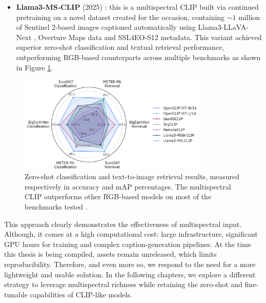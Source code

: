 \documentclass[a4paper, twoside, english]{sapthesis} %
\begin{document}
\begin{itemize}
    \item \textbf{Llama3‑MS‑CLIP} (2025) \cite{marimo2025beyond}: this is a multispectral CLIP built via continued pretraining on a novel dataset created for the occasion, containing $\sim 1$ million of Sentinel 2‑based images captioned automatically using Llama3-LLaVA-Next \cite{li2024llava}, Overture Maps data and SSL4EO-S12 \cite{wang2023ssl4eo} metadata. This variant achieved superior zero-shot classification and textual retrieval performance, outperforming RGB-based counterparts across multiple benchmarks as shown in Figure \ref{fig:msclip}.
\end{itemize}

\begin{figure}[h]
    \centering
    \includegraphics[width=0.8\textwidth]{img/MS-CLIP.png}
    \caption{\normalsize Zero-shot classification and text-to-image retrieval results, measured respectively in accuracy and mAP percentages. The multispectral CLIP outperforms other RGB-based models on most of the benchmarks tested \cite{marimo2025beyond}.}
    \label{fig:msclip}
\end{figure}

This approach clearly demonstrates the effectiveness of multispectral input. Although, it comes at a high computational cost: large infrastructure, significant GPU hours for training and complex caption-generation pipelines. At the time this thesis is being compiled, assets remain unreleased, which limits reproducibility. Therefore, and even more so, we respond to the need for a more lightweight and usable solution. In the following chapters, we explore a different strategy to leverage multispectral richness while retaining the zero-shot and fine-tunable capabilities of CLIP-like models.


\end{document}
